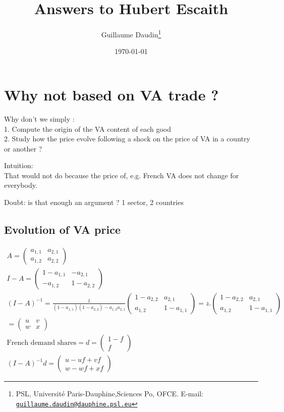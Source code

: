 \documentclass[11pt,a4paper]{article}
\newcommand{\email}[1]{\href{mailto:#1}{\nolinkurl{#1}}}
\begin{document}
\title{Answers to Hubert Escaith\\
\vspace{1cm}
}
\vspace{1cm}
\date{\today}
\author{Guillaume Daudin\thanks{PSL, Universit\'e Paris-Dauphine,Sciences Po, OFCE. E-mail: \email{guillaume.daudin@dauphine.psl.eu}}}
\maketitle

\section{Why not based on VA trade ?}
Why don't we simply : \\
1. Compute the origin of the VA content of each good \\
2. Study how the price evolve following a shock on the price of VA in a country or another ?

Intuition: \\
That would not do because the price of, e.g. French VA does not change for everybody.

Doubt: is that enough an argument ?
1 sector, 2 countries
\subsection{Evolution of VA price}
\begin{gather*}
A=\left(\begin{matrix}a_{1,1}&a_{2,1}\\a_{1,2}&a_{2,2}\end{matrix}\right)
\\
I-A=\left(\begin{matrix}1-a_{1,1}&-a_{2,1}\\-a_{1,2}&1-a_{2,2}\end{matrix}\right)
\\
\left(I-A\right)^{-1}=\frac{1}{\left(1-a_{1,1}\right)\left(1-a_{2,2}\right)-a_{1,2}a_{2,1}}\left(\begin{matrix}1-a_{2,2}&a_{2,1}\\a_{1,2}&1-a_{1,1}\end{matrix}\right) =z.\left(\begin{matrix}1-a_{2,2}&a_{2,1}\\a_{1,2}&1-a_{1,1}\end{matrix}\right) \\ 
=\left(\begin{matrix}u&v\\w&x\end{matrix}\right)
\\
\text{French demand shares}=d=\left(\begin{matrix}1-f\\f\end{matrix}\right) \\
\left(I-A\right)^{-1}d=\left(\begin{matrix}u-uf+vf\\w-wf+xf\end{matrix}\right)
\end{gather*}
\end{document}
